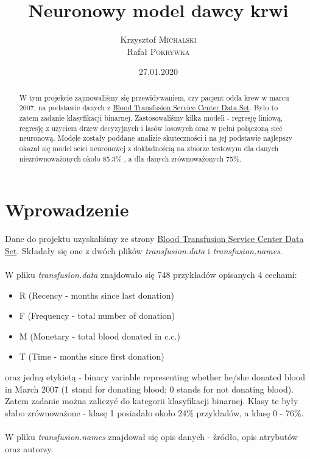 \documentclass[11pt, a4paper, notitlepage]{report}
\author{Krzysztof \textsc{Michalski} \\ Rafał \textsc{Pokrywka} }
\title{\textbf{Neuronowy model dawcy krwi}}
\date{27.01.2020}
\begin{document}
\clearpage\maketitle
\thispagestyle{empty}
\begin{abstract}
	W tym projekcie zajmowaliśmy się przewidywaniem, czy pacjent odda krew w marcu 2007, na podstawie danych z \href{https://archive.ics.uci.edu/ml/datasets/Blood+Transfusion+Service+Center/}{Blood Transfusion Service Center Data Set}.
	Było to zatem zadanie klasyfikacji binarnej. Zastosowaliśmy kilka modeli - regresję liniową, regresję z użyciem drzew decyzyjnych i lasów losowych oraz w pełni połączoną sieć neuronową. Modele zostały poddane analizie skuteczności i na jej podstawie
	najlepszy okazał się model seici neuronowej z dokładnością na zbiorze testowym dla danych niezrównoważonych około 85.3\% , a dla danych zrównoważonych 75\%.
\end{abstract}

\clearpage \tableofcontents
\thispagestyle{empty}

\setcounter{page}{1}

\chapter{Wprowadzenie}
	Dane do projektu uzyskaliśmy ze strony \href{https://archive.ics.uci.edu/ml/datasets/Blood+Transfusion+Service+Center/}{Blood Transfusion Service Center Data Set}. Składały się one z dwóch plików {\it transfusion.data} i {\it transfusion.names}.\\ \\
	W pliku  {\it transfusion.data} znajdowało się 748 przykładów opisanych 4 cechami:
	\begin{itemize}
	  \item R (Recency - months since last donation)
	  \item F (Frequency - total number of donation)
	  \item M (Monetary - total blood donated in c.c.)
	 \item T (Time - months since first donation)
	\end{itemize} oraz jedną etykietą - binary variable representing whether he/she donated blood in March 2007 (1 stand for donating blood; 0 stands for not donating blood). Zatem zadanie można zaliczyć do kategorii klasyfikacji binarnej. Klasy te były słabo zrównoważone - klasę 1
	posiadało około 24\% przykładów, a klasę 0 - 76\%.\\ \\
	W pliku {\it transfusion.names} znajdował się opis danych - źródło, opis atrybutów oraz autorzy.
\end{document}
